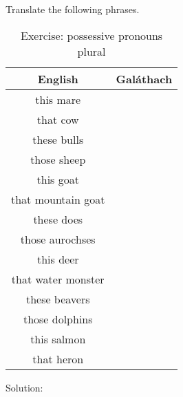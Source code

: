 Translate the following phrases.
\begin{table}[H]
\centering
\begin{tabular}{|c|M{5.0cm}|}
  \toprule
  \textbf{English} & \textbf{Gal\'{a}thach}\\
  \toprule
  this mare & \\
  \midrule
  that cow & \\
  \midrule
  these bulls & \\
  \midrule
  those sheep & \\
  \midrule
  this goat & \\
  \midrule
  that mountain goat & \\
  \midrule
  these does & \\
  \midrule
  those aurochses & \\
  \midrule
  this deer & \\
  \midrule
  that water monster & \\
  \midrule
  these beavers & \\
  \midrule
  those dolphins & \\
  \midrule
  this salmon & \\
  \midrule
  that heron & \\
  \bottomrule
\end{tabular}
\label{exercise_possessive_pronouns_plural}
\caption{Exercise: possessive pronouns plural}
\end{table}

\newpage
Solution:
\begin{table}[H]
\centering
{}
\label{solution_possessive_pronouns_plural}
\caption{Solution: possessive pronouns plural}
\end{table}

